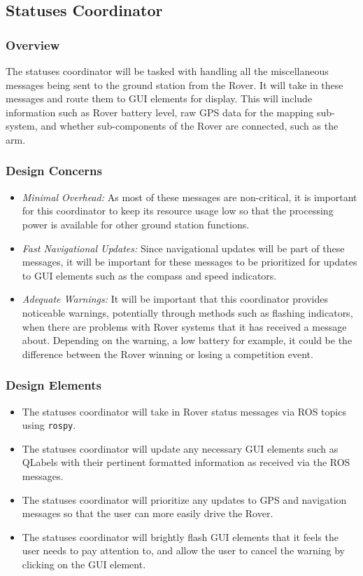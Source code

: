 \subsection{Statuses Coordinator}
\subsubsection{Overview}
The statuses coordinator will be tasked with handling all the miscellaneous messages being sent to the ground station from the Rover.
It will take in these messages and route them to GUI elements for display.
This will include information such as Rover battery level, raw GPS data for the mapping sub-system, and whether sub-components of the Rover are connected, such as the arm.

\subsubsection{Design Concerns}
\begin{itemize}
\item \textit{Minimal Overhead:} As most of these messages are non-critical, it is important for this coordinator to keep its resource usage low so that the processing power is available for other ground station functions.
\item \textit{Fast Navigational Updates:} Since navigational updates will be part of these messages, it will be important for these messages to be prioritized for updates to GUI elements such as the compass and speed indicators.
\item \textit{Adequate Warnings:} It will be important that this coordinator provides noticeable warnings, potentially through methods such as flashing indicators, when there are problems with Rover systems that it has received a message about.
Depending on the warning, a low battery for example, it could be the difference between the Rover winning or losing a competition event.
\end{itemize}

\subsubsection{Design Elements}
\begin{itemize}
\item The statuses coordinator will take in Rover status messages via ROS topics using \texttt{rospy}.
\item The statuses coordinator will update any necessary GUI elements such as QLabels with their pertinent formatted information as received via the ROS messages.
\item The statuses coordinator will prioritize any updates to GPS and navigation messages so that the user can more easily drive the Rover.
\item The statuses coordinator will brightly flash GUI elements that it feels the user needs to pay attention to, and allow the user to cancel the warning by clicking on the GUI element.
\end{itemize}

